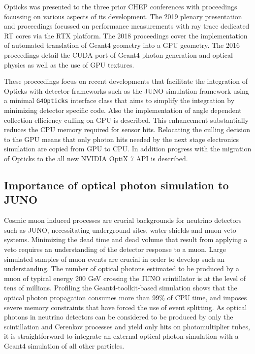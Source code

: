 \documentclass{webofc}
\begin{document}
Opticks was presented to the three prior CHEP conferences with proceedings
focussing on various aspects of its development. The 2019 plenary presentation 
and proceedings\cite{chep2019} focussed on performance measurements with ray trace dedicated RT cores via the RTX platform. 
The 2018 proceedings\cite{chep2018} cover the implementation of automated
translation of Geant4 geometry into a GPU geometry.
The 2016 proceedings\cite{chep2016} detail the CUDA port of Geant4 photon generation 
and optical physics as well as the use of GPU textures. 
%

These proceedings focus on recent developments that facilitate the integration of Opticks 
with detector frameworks such as the JUNO simulation framework using a minimal 
{\tt G4Opticks} interface class that aims to simplify the integration 
by minimizing detector specific code. Also the implementation of angle dependent 
collection efficiency culling on GPU is described. This enhancement substantially 
reduces the CPU memory required for sensor hits.  Relocating the culling 
decision to the GPU means that only photon hits needed by the next stage electronics simulation 
are copied from GPU to CPU. In addition progress with the migration of Opticks to the 
all new NVIDIA OptiX 7 API is described.
%
%
\subsection{Importance of optical photon simulation to JUNO}%
%
%
Cosmic muon induced processes are crucial backgrounds for neutrino
detectors such as JUNO\cite{juno},
necessitating underground sites, water shields and muon veto systems.
Minimizing the dead time and dead volume that result from applying
a veto requires an understanding of the detector response to a muon.
Large simulated samples of muon events are crucial in order to
develop such an understanding.
%
The number of optical photons estimated to be produced by a muon of
typical energy 200 GeV crossing the JUNO scintillator is at the level of tens of millions.
Profiling the Geant4-toolkit-based simulation shows that the optical photon propagation 
consumes more than 99\% of CPU time, and imposes severe memory constraints that have forced
the use of event splitting.  
%
As optical photons in neutrino detectors can be considered to be produced
by only the scintillation and Cerenkov processes and yield only hits
on photomultiplier tubes, it is straightforward to integrate an
external optical photon simulation with a Geant4 simulation of all other particles.
%
\end{document}
